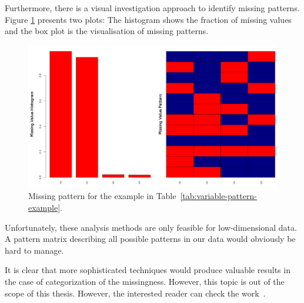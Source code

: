 Furthermore, there is a visual investigation approach to identify missing patterns. Figure \ref{fig:missing-plot} presents two plots: The histogram shows the fraction of missing values and the box plot is the visualisation of missing patterns.

\begin{figure}[h!]
    \centering
    \includegraphics[scale=0.3]{Graphics/missing-pattern-plot.png}
    \caption{Missing pattern for the example in Table~\ref{tab:variable-pattern-example}.}
    \label{fig:missing-plot}
\end{figure}

Unfortunately, these analysis methods are only feasible for low-dimensional data. A pattern matrix describing all possible patterns in our data would obviously be hard to manage.

It is clear that more sophisticated techniques would produce valuable results in the case of categorization of the missingness. However, this topic is out of the scope of this thesis. However, the interested reader can check the work~\cite{Mohan;Pearl:2014}.

